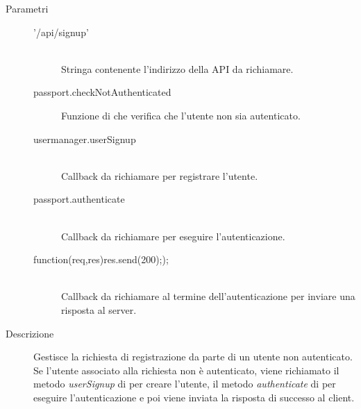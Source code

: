 \begin{description}
\begin{description}
\begin{mldescription}
 \begin{description}
    \item[Parametri] \hfill
     \begin{description}
      \item['/api/signup'] \hfill \\
      Stringa contenente l'indirizzo della API da richiamare.
      \item[passport.checkNotAuthenticated]
      Funzione di  che verifica che l'utente non sia autenticato.
      \item[usermanager.userSignup] \hfill \\
      Callback da richiamare per registrare l'utente.
      \item[passport.authenticate] \hfill \\
      Callback da richiamare per eseguire l'autenticazione.
      \item[function(req,res){res.send(200););}] \hfill \\
      Callback da richiamare al termine dell'autenticazione per inviare una risposta al server.
     \end{description}
    \item[Descrizione]
    Gestisce la richiesta di registrazione da parte di un utente non autenticato. Se l'utente associato alla richiesta non è autenticato, viene richiamato il metodo \textit{userSignup} di  per creare l'utente, il metodo \textit{authenticate} di  per eseguire l'autenticazione e poi viene inviata la risposta di successo al client.
 \end{description}
 

\end{mldescription}
\end{description}
\end{description}
